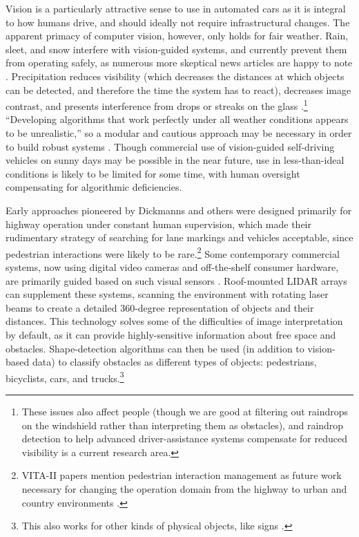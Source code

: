 Vision is a particularly attractive sense to use in automated cars
as it is integral to how humans drive, and should ideally not
require infrastructural changes. The apparent primacy of computer
vision, however, only holds for fair 
weather. Rain, sleet, and 
snow interfere with vision-guided systems, and currently prevent them
from operating safely, as numerous more skeptical news articles are
happy to note \cite{knightFurther} \cite{gomesObstacles}.
Precipitation reduces visibility (which decreases
the distances at which objects can be detected, and therefore the
time the system has to react), decreases image
contrast, and presents interference from drops or
streaks on the glass
\cite{rainADAS}.\footnote{These issues also 
affect people (though we are good at filtering out raindrops on the
windshield rather than interpreting them as obstacles), and raindrop
detection to help advanced driver-assistance systems compensate for
reduced visibility is a current research area.} 
``Developing algorithms that work perfectly
under all weather conditions appears to be unrealistic,'' so a
modular and cautious approach may be necessary in order to build
robust systems \cite[p. 50]{rainADAS}. Though commercial use of
vision-guided self-driving vehicles on 
sunny days may be possible in the near future, use in
less-than-ideal conditions is likely to be limited for some time,
with human oversight compensating for algorithmic deficiencies. 



Early approaches pioneered by
Dickmanns and others were designed primarily for 
highway operation under constant human supervision, which made their
rudimentary strategy of searching for lane markings and vehicles
acceptable, since pedestrian interactions were likely to be
rare.\footnote{VITA-II papers mention pedestrian
  interaction management as future work necessary for changing the
  operation domain from the highway to urban and country environments \cite{ulmerVITA-II}.}
Some contemporary commercial systems, now using digital video cameras
and off-the-shelf consumer hardware, are primarily guided based on
such visual sensors \cite{makingBertha}. Roof-mounted
LIDAR arrays can supplement
these systems, scanning the environment with 
rotating laser beams to create a detailed 360-degree
representation of objects and their distances. This technology
solves some of the difficulties of image interpretation by default, as
it can provide highly-sensitive information about free space and
obstacles. Shape-detection algorithms can then be used (in addition to
vision-based data) to classify obstacles as different types of
objects: pedestrians, bicyclists, cars, and trucks.\footnote{This also
  works for other kinds of physical objects, like signs \cite{fukuda}.}

